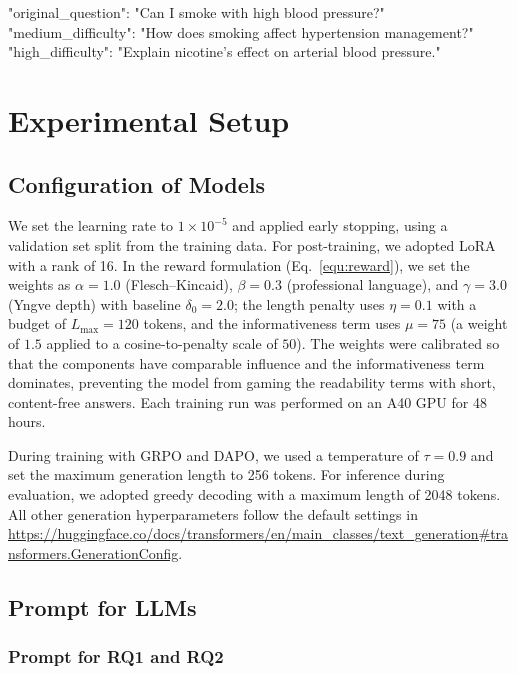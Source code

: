 \begin{tcolorbox}[colback=blue!5!white,colframe=blue!75!black,title=Example 5]
"original\_question": "Can I smoke with high blood pressure?"\\
"medium\_difficulty": "How does smoking affect hypertension management?"\\
"high\_difficulty": "Explain nicotine's effect on arterial blood pressure."
\end{tcolorbox}

\section{Experimental Setup}\label{app:exp}

\subsection{Configuration of Models}\label{app:hyperparams}
We set the learning rate to $1 \times 10^{-5}$ and applied early stopping, using a validation set split from the training data. For post-training, we adopted LoRA~\citep{hu2021loralowrankadaptationlarge} with a rank of 16. In the reward formulation (Eq.~\ref{equ:reward}), we set the weights as $\alpha = 1.0$ (Flesch--Kincaid), $\beta = 0.3$ (professional language), and $\gamma = 3.0$ (Yngve depth) with baseline $\delta_0 = 2.0$; the length penalty uses $\eta = 0.1$ with a budget of $L_{\max} = 120$ tokens, and the informativeness term uses $\mu = 75$ (a weight of $1.5$ applied to a cosine-to-penalty scale of $50$). The weights were calibrated so that the components have comparable influence and the informativeness term dominates, preventing the model from gaming the readability terms with short, content-free answers. Each training run was performed on an A40 GPU for 48 hours.

During training with GRPO and DAPO, we used a temperature of $\tau = 0.9$ and set the maximum generation length to 256 tokens. For inference during evaluation, we adopted greedy decoding with a maximum length of 2048 tokens. All other generation hyperparameters follow the default settings in \url{https://huggingface.co/docs/transformers/en/main_classes/text_generation#transformers.GenerationConfig}.

\subsection{Prompt for LLMs}
\label{app:prompt}

\subsubsection{Prompt for RQ1 and RQ2}\label{app:prompt_rq1_and_rq2}

